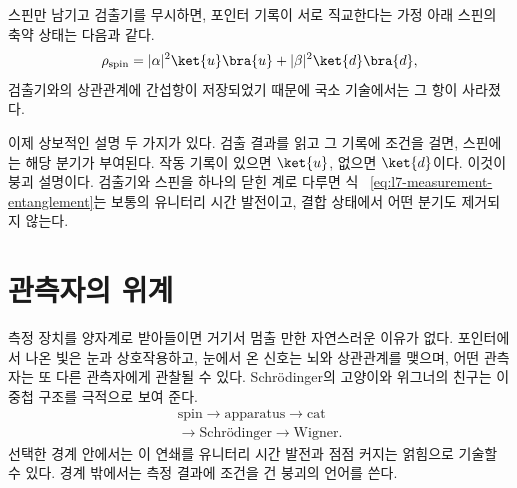 스핀만 남기고 검출기를 무시하면, 포인터 기록이 서로 직교한다는 가정 아래 스핀의 축약 상태는 다음과 같다.
\begin{equation}
\rho_{\mathrm{spin}}
=|\alpha|^2\ket{u}\bra{u}
+|\beta|^2\ket{d}\bra{d},
\label{eq:l7-postmeasurement-reduced-state}
\end{equation}
검출기와의 상관관계에 간섭항이 저장되었기 때문에 국소 기술에서는 그 항이 사라졌다.

이제 상보적인 설명 두 가지가 있다. 검출 결과를 읽고 그 기록에 조건을 걸면, 스핀에는 해당 분기가 부여된다. 작동 기록이 있으면 \(\ket{u}\), 없으면 \(\ket{d}\)이다. 이것이 붕괴 설명이다. 검출기와 스핀을 하나의 닫힌 계로 다루면 식 ~\eqref{eq:l7-measurement-entanglement}는 보통의 유니터리 시간 발전이고, 결합 상태에서 어떤 분기도 제거되지 않는다.

\begin{classroomqa}
\end{classroomqa}

\begin{classroomqa}
\end{classroomqa}

\section{관측자의 위계}

측정 장치를 양자계로 받아들이면 거기서 멈출 만한 자연스러운 이유가 없다. 포인터에서 나온 빛은 눈과 상호작용하고, 눈에서 온 신호는 뇌와 상관관계를 맺으며, 어떤 관측자는 또 다른 관측자에게 관찰될 수 있다. Schr\"odinger의 고양이와 위그너의 친구는 이 중첩 구조를 극적으로 보여 준다.
\begin{equation}
\begin{gathered}
\text{spin}
\longrightarrow
\text{apparatus}
\longrightarrow
\text{cat}\\
\longrightarrow
\text{Schr\"odinger}
\longrightarrow
\text{Wigner}.
\end{gathered}
\label{eq:l7-observer-chain}
\end{equation}
선택한 경계 안에서는 이 연쇄를 유니터리 시간 발전과 점점 커지는 얽힘으로 기술할 수 있다. 경계 밖에서는 측정 결과에 조건을 건 붕괴의 언어를 쓴다.

